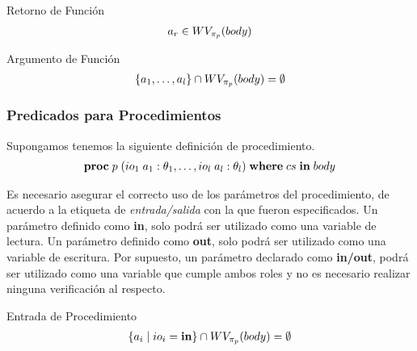 \begin{Predicado}
\label{PFRetorno}
Retorno de Función
\begin{gather*}
a_r \in WV_{\pi_{p}}(body)
\end{gather*}
\end{Predicado}


\begin{Predicado}
\label{PFArgumento}
Argumento de Función
\begin{gather*}
\{ a_1, \ldots, a_l \} \cap WV_{\pi_{p}}(body) = \emptyset
\end{gather*}
\end{Predicado}

\subsubsection{Predicados para Procedimientos}

Supongamos tenemos la siguiente definición de procedimiento.
\begin{gather*}
\mathbf{proc} \; p \; (io_1 \; a_1: \theta_1, \ldots, io_l \; a_l: \theta_l) \; \mathbf{where} \; cs \; \mathbf{in} \; body
\end{gather*}

Es necesario asegurar el correcto uso de los parámetros del procedimiento, de acuerdo a la etiqueta de \textit{entrada/salida} con la que fueron especificados.
Un parámetro definido como \textbf{in}, solo podrá ser utilizado como una variable de lectura.
Un parámetro definido como \textbf{out}, solo podrá ser utilizado como una variable de escritura.
Por supuesto, un parámetro declarado como \textbf{in/out}, podrá ser utilizado como una variable que cumple ambos roles y no es necesario realizar ninguna verificación al respecto.

\begin{Predicado}
\label{PPEntrada}
Entrada de Procedimiento
\begin{gather*}
\{ a_i \mid io_i = \mathbf{in} \} \cap WV_{\pi_{p}}(body) = \emptyset
\end{gather*}
\end{Predicado}

